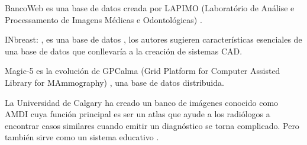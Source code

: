 BancoWeb es una base de datos creada por LAPIMO (Laboratório de Análise e
Processamento de Imagens Médicas e Odontológicas) \cite{matheus2011online}.

INbreast: \cite{moreira2012inbreast}, es una base de datos , los autores
sugieren características esenciales de una base de datos que conllevaría a la
creación de sistemas CAD.

Magic-5 \cite{bellotti2004magic} es la evolución de GPCalma (Grid Platform for
Computer Assisted Library for MAmmography) \cite{lauria2006gpcalma}, una base
de datos distribuida. 

La Universidad de Calgary ha creado un banco de imágenes conocido como AMDI
\cite{suri2006recent} cuya función principal es ser un atlas que ayude a los
radiólogos a encontrar casos similares cuando emitir un diagnóstico se torna
complicado. Pero también sirve como un sistema educativo
\cite{guliato2009indiam}.


